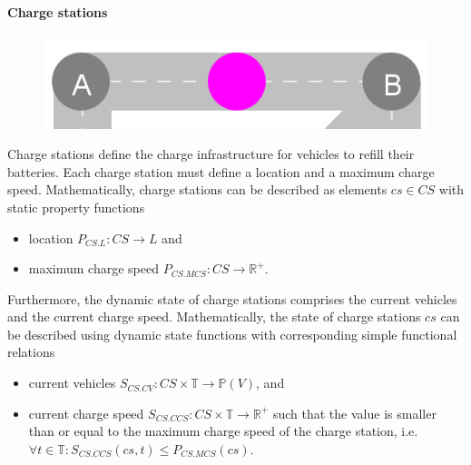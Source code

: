 \documentclass[graybox]{svmult}
\begin{document}

\paragraph{Charge stations}
\begin{figure}
	\centering
		\includegraphics[scale=0.25]{../../concepts/charge-station.png}
\end{figure}
Charge stations define the charge infrastructure for vehicles to refill their batteries.
Each charge station must define a location and a maximum charge speed.
Mathematically, charge stations can be described as elements $cs \in CS$ with static property functions
\begin{itemize}
	\item location $P_{CS.L}: CS \rightarrow L$ and
	\item maximum charge speed $P_{CS.MCS}: CS \rightarrow \mathbb{R}^+$.
\end{itemize}
Furthermore, the dynamic state of charge stations comprises the current vehicles and the current charge speed.
Mathematically, the state of charge stations $cs$ can be described using dynamic state functions with corresponding simple functional relations
\begin{itemize}
	\item current vehicles $S_{CS.CV}: CS \times \mathbb{T} \rightarrow \mathbb{P}(V)$, and
	\item current charge speed $S_{CS.CCS}: CS \times \mathbb{T} \rightarrow \mathbb{R}^+$ such that the value is smaller than or equal to the maximum charge speed of the charge station, i.e.\ $\forall t \in \mathbb{T}: S_{CS.CCS}(cs,t) \leq P_{CS.MCS}(cs)$.
\end{itemize}

\end{document}
